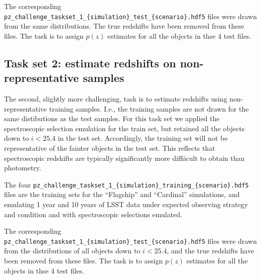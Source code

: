 \documentclass[modern]{desc-tex/styles/lsstdescnote}
\begin{document}
The corresponding 
\texttt{pz\_challenge\_taskset\_1\_\{simulation\}\_test\_\{scenario\}.hdf5}
files were drawn from the same distributions.  The true redshifts have
been removed from these files.   The task is to assign $p(z)$
estimates for all the objects in thse 4 test files.



\subsection{Task set 2:  estimate redshifts on non-representative
  samples}

The second, slightly more challenging, task is to estimate redshifts
using non-representative training samples.  I.e., the training samples
are not drawn for the same distibutions as the test samples.  For this task set we
applied the spectroscopic selection emulation for the train set, but
retained all the objects down to $i < 25.4$ in the test set.
Accordingly, the training set will not be representative of the
fainter objects in the test set.   This reflects that spectroscopic redshifts
are typically significantly more diffiicult to obtain than photometry.

The four 
\texttt{pz\_challenge\_taskset\_1\_\{simulation\}\_training\_\{scenario\}.hdf5}
files are the training sets for the ``Flagship'' and ``Cardinal''
simulations, and emulating 1 year and 10 years of LSST data under
expected observing strategy and condition and with spectroscopic
selections emulated.

The corresponding 
\texttt{pz\_challenge\_taskset\_1\_\{simulation\}\_test\_\{scenario\}.hdf5}
files were drawn from the distributions of all objects down to $i <
25.4$, and the true redshifts have been removed from these files. 
The task is to assign $p(z)$ estimates for all the objects in thse 4 test files.






\end{document}
